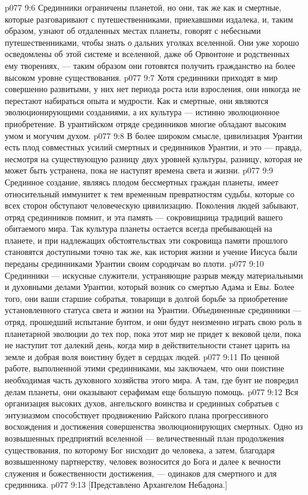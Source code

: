 \vs p077 9:6 \pc Срединники ограничены планетой, но они, так же как и смертные, которые разговаривают с путешественниками, приехавшими издалека, и, таким образом, узнают об отдаленных местах планеты, говорят с небесными путешественниками, чтобы знать о дальних уголках вселенной. Они уже хорошо осведомлены об этой системе и вселенной, даже об Орвонтоне и родственных ему творениях, --- таким образом они готовятся получить гражданство на более высоком уровне существования.
\vs p077 9:7 Хотя срединники приходят в мир совершенно развитыми, у них нет периода роста или взросления, они никогда не перестают набираться опыта и мудрости. Как и смертные, они являются эволюционирующими созданиями, а их культура --- истинно эволюционное приобретение. В урантийском отряде срединников многие обладают высоким умом и могучим духом.
\vs p077 9:8 В более широком смысле, цивилизация Урантии есть плод совместных усилий смертных и срединников Урантии, и это --- правда, несмотря на существующую разницу двух уровней культуры, разницу, которая не может быть устранена, пока не наступят времена света и жизни.
\vs p077 9:9 Срединное создание, являясь плодом бессмертных граждан планеты, имеет относительный иммунитет к тем временным превратностям судьбы, которые со всех сторон обступают человеческую цивилизацию. Поколения людей забывают, отряд срединников помнит, и эта память --- сокровищница традиций вашего обитаемого мира. Так культура планеты остается всегда пребывающей на планете, и при надлежащих обстоятельствах эти сокровища памяти прошлого становятся доступными точно так же, как история жизни и учение Иисуса были переданы срединниками Урантии своим сородичам во плоти.
\vs p077 9:10 Срединники --- искусные служители, устраняющие разрыв между материальными и духовными делами Урантии, который возник со смертью Адама и Евы. Более того, они ваши старшие собратья, товарищи в долгой борьбе за приобретение установленного статуса света и жизни на Урантии. Объединенные срединники --- отряд, прошедший испытание бунтом, и они будут неизменно играть свою роль в планетарной эволюции до тех пор, пока этот мир не придет к вековой цели, пока не наступит тот далекий день, когда мир в действительности станет царить на земле и добрая воля воистину будет в сердцах людей.
\vs p077 9:11 По ценной работе, выполненной этими срединниками, мы заключаем, что они поистине необходимая часть духовного хозяйства этого мира. А там, где бунт не повредил делам планеты, они оказывают серафимам еще большую помощь.
\vs p077 9:12 \pc Вся организация высоких духов, ангельского воинства и срединных собратьев с энтузиазмом способствует продвижению Райского плана прогрессивного восхождения и достижения совершенства эволюционирующих смертных. Одно из возвышенных предприятий вселенной --- величественный план продолжения существования, по которому Бог нисходит до человека, а затем, благодаря возвышенному партнерству, человек возносится до Бога и далее к вечности служения и божественности достижения, --- одинаков для смертного и для срединника.
\vsetoff
\vs p077 9:13 [Представлено Архангелом Небадона.]
